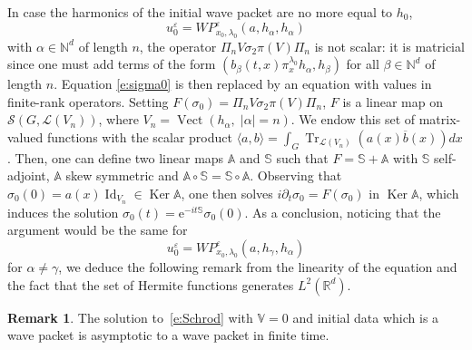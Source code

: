 \documentclass[JEP,XML,SOM,Unicode,published]{cedram}
\let\mathcal\mathscr
\newcommand{\rme}{\mathrm{e}}
\DeclareMathOperator{\Id}{Id}
\DeclareMathOperator{\Ker}{Ker}
\DeclareMathOperator{\Tr}{Tr}
\DeclareMathOperator{\Vect}{Vect}
\theoremstyle{plain}
\theoremstyle{definition}
\newtheorem{remark}[theorem]{Remark}
\let\eps\varepsilon
\def\R{{\mathbb R}}
\def\N{{\mathbb N}}
\def\bbV{{\mathbb V}}
\def\bbA{{\mathbb A}}
\def\bbS{{\mathbb S}}
\begin{document}
In case the harmonics of the initial wave packet are no more equal to $h_0$, \eg
\[
u^\eps_0= WP^\eps_{x_0,\lambda_0} (a,h_\alpha,h_\alpha)
\]
with $\alpha\in\N^d$ of length $n$, the operator $\Pi_n V\sigma_2 \pi(V) \Pi_n$ is not scalar: it is matricial since one must add terms of the form $(b_\beta(t,x) \pi^{\lambda_0}_x h_\alpha, h_\beta)$ for all $\beta\in\N^d$ of length $n$. Equation \eqref{e:sigma0} is then replaced by an equation with values in finite-rank operators. Setting $F(\sigma_0)=\Pi_n V\sigma_2 \pi(V) \Pi_n$, $F$ is a linear map on~${\mathcal S}(G, \mathcal L(V_n))$, where $V_n=\Vect (h_\alpha,\;|\alpha|=n)$. We endow this set of matrix-valued functions with the scalar product $\langle a, b\rangle =\int_G \Tr_{ \mathcal L(V_n)} (a(x)\overline b(x)) dx$. Then, one can define two linear maps $\bbA$ and $\bbS$ such that $F=\bbS+\bbA$ with $\bbS$ self-adjoint, $\bbA$ skew symmetric and $\bbA\circ \bbS=\bbS \circ \bbA$. Observing that $\sigma_0(0)= a(x) \Id_{V_n}\in \Ker \bbA $, one then solves $i\partial_t \sigma_0= F(\sigma_0)$ in $\Ker \bbA $, which induces the solution $\sigma_0(t) = \rme^{-it\bbS} \sigma_0(0)$. As a conclusion, noticing that the argument would be the same for
\[
u^\eps_0= WP^\eps_{x_0,\lambda_0} (a,h_\gamma,h_\alpha)
\]
for $\alpha\not=\gamma$, we deduce the following remark from the linearity of the equation and the fact that the set of Hermite functions generates $L^2(\R^d)$.
\begin{remark} \label{r:profiles}
The solution to~\eqref{e:Schrod} with $\bbV=0$ and initial data which is a wave packet is asymptotic to a wave packet in finite time.
\end{remark}

\backmatter


\end{document}
